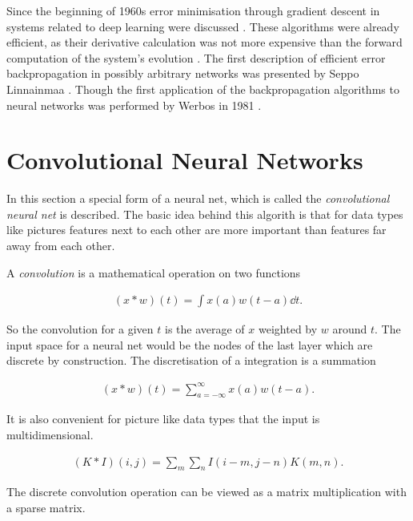 \documentclass[12pt, a4paper]{thesis}
\begin{document}
Since the beginning of 1960s error minimisation through gradient descent in
systems related to deep learning were discussed
\cite{Kelley1960,bryson1961,BRYSON-DENHAM-61A,PONTRYAGIN61A,dreyfus1962,Wilkinson1965,Amari1967TAP,bryson1969applied}.
These algorithms were already efficient, as their derivative calculation was not
more expensive than the forward computation of the system's evolution
\cite{schmidhuber15_deep_learn_neural_networ}.  The first description of efficient
error backpropagation in possibly arbitrary networks was presented by Seppo
Linnainmaa \cite{Linnainmaa:1970,Linnainmaa:1976}. Though the first application of
the backpropagation algorithms to neural networks was performed by Werbos in 1981
\cite{Werbos:81sensitivity}.

\section{Convolutional Neural Networks}
\label{sec:orgf8e2395}

In this section a special form of a neural net, which is called the
\emph{convolutional neural net} is described. The basic idea behind this algorith is
that for data types like pictures features next to each other are more important
than features far away from each other.

A \emph{convolution} is a mathematical operation on two functions

\begin{align}
 (x * w)(t) = \int x(a) w(t-a)\dd t.
\end{align}

So the convolution for a given \(t\) is the average of \(x\) weighted by \(w\) around
\(t\). The input space for a neural net would be the nodes of the last layer which
are discrete by construction. The discretisation of a integration is a summation

\begin{align}
 (x * w)(t) = \sum^{\infty}_{a=-\infty} x(a) w(t-a).
\end{align}

It is also convenient for picture like data types that the input is
multidimensional.

\begin{align}
 (K * I)(i,j) = \sum_{m} \sum_{n} I(i-m,j-n) K(m,n).
\end{align}

The discrete convolution operation can be viewed as a matrix multiplication with a
sparse matrix.
\end{document}
